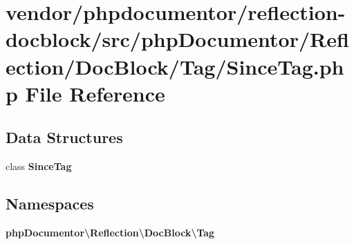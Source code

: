 \section{vendor/phpdocumentor/reflection-\/docblock/src/php\+Documentor/\+Reflection/\+Doc\+Block/\+Tag/\+Since\+Tag.php File Reference}
\label{_since_tag_8php}
\subsection*{Data Structures}
\begin{DoxyCompactItemize}
\item 
class {\bf Since\+Tag}
\end{DoxyCompactItemize}
\subsection*{Namespaces}
\begin{DoxyCompactItemize}
\item 
 {\bf php\+Documentor\textbackslash{}\+Reflection\textbackslash{}\+Doc\+Block\textbackslash{}\+Tag}
\end{DoxyCompactItemize}

